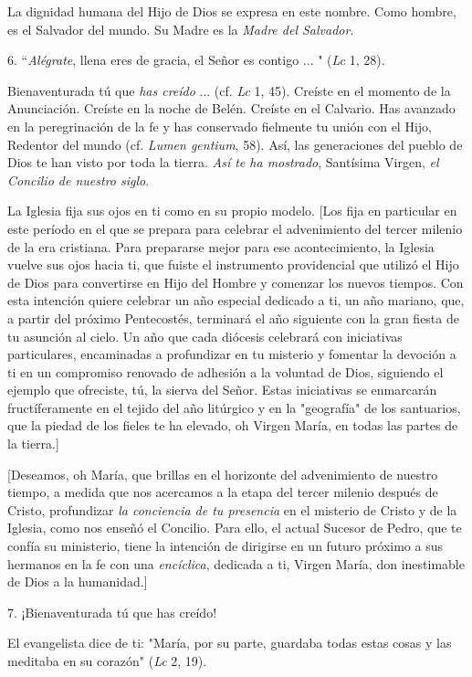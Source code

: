 \begin{body}
La dignidad humana del Hijo de Dios se expresa en este nombre. Como
hombre, es el Salvador del mundo. Su Madre es la \emph{Madre del
	Salvador}.

6. ``\emph{Alégrate}, llena eres de gracia, el Señor es contigo ... "
(\emph{Lc} 1, 28).

Bienaventurada tú que \emph{has creído} ... (cf. \emph{Lc} 1, 45).
Creíste en el momento de la Anunciación. Creíste en la noche de Belén.
Creíste en el Calvario. Has avanzado en la peregrinación de la fe y has
conservado fielmente tu unión con el Hijo, Redentor del mundo (cf.
\emph{Lumen gentium}, 58). Así, las generaciones del pueblo de Dios te
han visto por toda la tierra. \emph{Así te ha mostrado}, Santísima
Virgen, \emph{el Concilio de nuestro siglo}.

La Iglesia fija sus ojos en ti como en su propio modelo. {[}Los fija en
particular en este período en el que se prepara para celebrar el
advenimiento del tercer milenio de la era cristiana. Para prepararse
mejor para ese acontecimiento, la Iglesia vuelve sus ojos hacia ti, que
fuiste el instrumento providencial que utilizó el Hijo de Dios para
convertirse en Hijo del Hombre y comenzar los nuevos tiempos. Con esta
intención quiere celebrar un año especial dedicado a ti, un año mariano,
que, a partir del próximo Pentecostés, terminará el año siguiente con la
gran fiesta de tu asunción al cielo. Un año que cada diócesis celebrará
con iniciativas particulares, encaminadas a profundizar en tu misterio y
fomentar la devoción a ti en un compromiso renovado de adhesión a la
voluntad de Dios, siguiendo el ejemplo que ofreciste, tú, la sierva del
Señor. Estas iniciativas se enmarcarán fructíferamente en el tejido del
año litúrgico y en la "geografía" de los santuarios, que la piedad de
los fieles te ha elevado, oh Virgen María, en todas las partes de la
tierra.{]}

{[}Deseamos, oh María, que brillas en el horizonte del advenimiento de
nuestro tiempo, a medida que nos acercamos a la etapa del tercer milenio
después de Cristo, profundizar \emph{la conciencia de tu presencia} en
el misterio de Cristo y de la Iglesia, como nos enseñó el Concilio. Para
ello, el actual Sucesor de Pedro, que te confía su ministerio, tiene la
intención de dirigirse en un futuro próximo a sus hermanos en la fe con
una \emph{encíclica}, dedicada a ti, Virgen María, don inestimable de
Dios a la humanidad.{]}

7. ¡Bienaventurada tú que has creído!

El evangelista dice de ti: "María, por su parte, guardaba todas estas
cosas y las meditaba en su corazón" (\emph{Lc} 2, 19).


\end{body}
